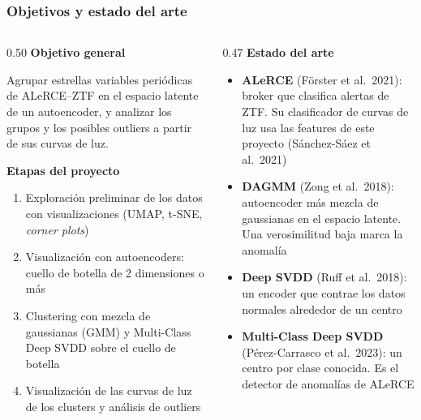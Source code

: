 \begin{frame}
\frametitle{Objetivos y estado del arte}
\vspace{-0.5em}
\begin{columns}[T]
\begin{column}{0.50\textwidth}
{\small \textbf{Objetivo general}}
\vspace{0.2em}

{\footnotesize Agrupar estrellas variables periódicas de ALeRCE--ZTF en el espacio latente de un
autoencoder, y analizar los grupos y los posibles outliers a partir de sus curvas de luz.}

\vspace{0.7em}
{\small \textbf{Etapas del proyecto}}
\vspace{0.1em}
{\footnotesize
\begin{enumerate}\itemsep=3.5pt
\item Exploración preliminar de los datos con visualizaciones (UMAP, t-SNE, \emph{corner plots})
\item Visualización con autoencoders: cuello de botella de 2 dimensiones o más
\item Clustering con mezcla de gaussianas (GMM) y Multi-Class Deep SVDD sobre el cuello de botella
\item Visualización de las curvas de luz de los clusters y análisis de outliers
\end{enumerate}
}
\end{column}

\begin{column}{0.47\textwidth}
{\small \textbf{Estado del arte}}
\vspace{0.1em}
{\footnotesize
\begin{itemize}\itemsep=4.5pt
\item \textbf{ALeRCE} {\color{gray}(Förster et al.\ 2021)}: broker que clasifica alertas de ZTF.
  Su clasificador de curvas de luz usa las features de este proyecto
  {\color{gray}(Sánchez-Sáez et al.\ 2021)}
\item \textbf{DAGMM} {\color{gray}(Zong et al.\ 2018)}: autoencoder más mezcla de gaussianas en el
  espacio latente. Una verosimilitud baja marca la anomalía
\item \textbf{Deep SVDD} {\color{gray}(Ruff et al.\ 2018)}: un encoder que contrae los datos
  normales alrededor de un centro
\item \textbf{Multi-Class Deep SVDD} {\color{gray}(Pérez-Carrasco et al.\ 2023)}: un centro por
  clase conocida. Es el detector de anomalías de ALeRCE
\end{itemize}
}
\end{column}
\end{columns}
\end{frame}
